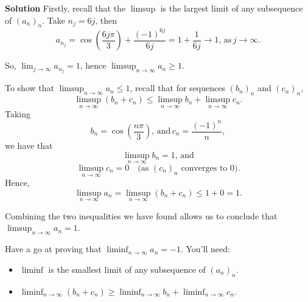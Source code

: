 \documentclass[
  12pt,
  a4paper]{extarticle}
\providecommand{\tightlist}{%
  \setlength{\itemsep}{0pt}\setlength{\parskip}{0pt}}
\theoremstyle{plain}
\theoremstyle{definition}
\theoremstyle{plain}
\theoremstyle{plain}
\theoremstyle{plain}
\theoremstyle{plain}
\theoremstyle{definition}
\theoremstyle{definition}
\theoremstyle{remark}
\theoremstyle{remark}
\renewcommand{\;}{\,}
\begin{document}
\textbf{Solution}
Firstly, recall that the \(\limsup\) is the largest limit of any subsequence of \((a_n)_n\). Take \(n_j = 6j\), then \[a_{n_j} = \cos\left(\frac{6j\pi}{3}\right) + \frac{(-1)^{6j}}{6j} = 1 + \frac{1}{6j} \to 1, \; \text{as} \; j \to \infty.\]

So, \(\lim_{j \to \infty} a_{n_j} = 1\), hence \(\limsup_{n \to \infty} a_n \geq 1\).

To show that \(\limsup_{n \to \infty} a_n \leq 1\), recall that for sequences \((b_n)_n\) and \((c_n)_n\), \[\limsup_{n \to \infty}(b_n + c_n) \leq \limsup_{n \to \infty}b_n + \limsup_{n \to \infty}c_n.\] Taking \[b_n = \cos\left(\frac{n\pi}{3}\right), \; \text{and} \; c_n = \frac{(-1)^n}{n},\] we have that \[\limsup_{n \to \infty} b_n = 1, \; \text{and}\] \[\limsup_{n \to \infty} c_n = 0 \quad \text{(as $(c_n)_n$ converges to $0$)}.\] Hence,
\[\limsup_{n \to \infty} a_n = \limsup_{n \to \infty}(b_n + c_n) \leq 1 + 0 = 1.\]

Combining the two inequalities we have found allows us to conclude that \(\limsup_{n \to \infty} a_n = 1.\)

Have a go at proving that \(\liminf_{n \to \infty} a_n = -1\). You'll need:

\begin{itemize}
\tightlist
\item
  \(\liminf\) is the smallest limit of any subsequence of \((a_n)_n\).
\item
  \(\liminf_{n \to \infty}(b_n + c_n) \geq \liminf_{n \to \infty}b_n + \liminf_{n \to \infty}c_n.\)
\end{itemize}
\end{document}
